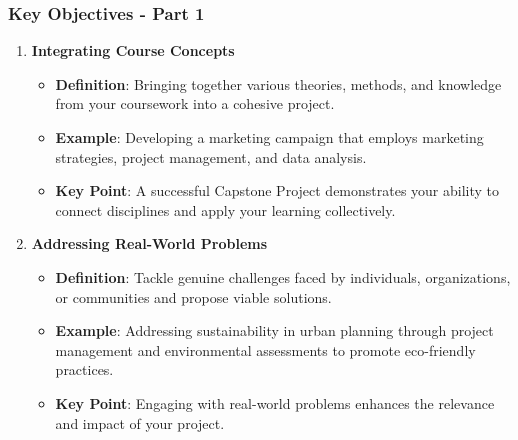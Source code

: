 \documentclass{beamer}
\begin{document}
\begin{frame}[fragile]
    \frametitle{Key Objectives - Part 1}
    \begin{enumerate}
        \item \textbf{Integrating Course Concepts}
            \begin{itemize}
                \item \textbf{Definition}: Bringing together various theories, methods, and knowledge from your coursework into a cohesive project.
                \item \textbf{Example}: Developing a marketing campaign that employs marketing strategies, project management, and data analysis.
                \item \textbf{Key Point}: A successful Capstone Project demonstrates your ability to connect disciplines and apply your learning collectively.
            \end{itemize}
        
        \item \textbf{Addressing Real-World Problems}
            \begin{itemize}
                \item \textbf{Definition}: Tackle genuine challenges faced by individuals, organizations, or communities and propose viable solutions.
                \item \textbf{Example}: Addressing sustainability in urban planning through project management and environmental assessments to promote eco-friendly practices.
                \item \textbf{Key Point}: Engaging with real-world problems enhances the relevance and impact of your project.
            \end{itemize}
    \end{enumerate}
\end{frame}
\end{document}
